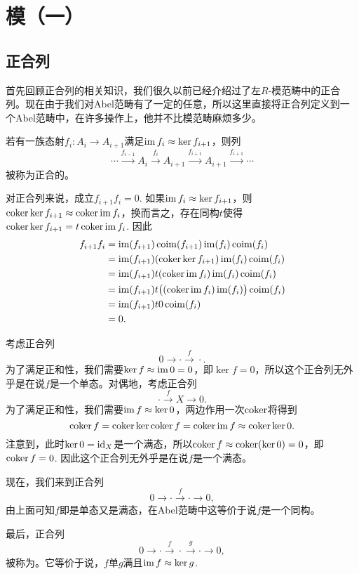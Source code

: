 
\chapter{模（一）}

\section{正合列}

首先回顾正合列的相关知识，我们很久以前已经介绍过了左$R$-模范畴中的正合列。现在由于我们对Abel范畴有了一定的任意，所以这里直接将正合列定义到一个Abel范畴中，在许多操作上，他并不比模范畴麻烦多少。

\begin{para}
若有一族态射$f_i:A_i\to A_{i+1}$满足$\operatorname{im} f_i\approx \ker f_{i+1}$，则列
\[
	\cdots \xrightarrow{f_{i-1}}A_i \xrightarrow{f_i} A_{i+1} \xrightarrow{f_{i+1}} A_{i+1}\xrightarrow{f_{i+1}}\cdots
\]
被称为正合的。
\end{para}

对正合列来说，成立$f_{i+1}f_i=0$. 如果$\operatorname{im} f_i\approx \ker f_{i+1}$，则$\operatorname{coker} \ker f_{i+1} \approx \operatorname{coker} \operatorname{im} f_i$，换而言之，存在同构$t$使得$\operatorname{coker} \ker f_{i+1}=t\operatorname{coker} \operatorname{im} f_i$. 因此
\begin{align*}
f_{i+1}f_i&=\operatorname{im}(f_{i+1})\operatorname{coim}(f_{i+1})\operatorname{im}(f_{i})\operatorname{coim}(f_{i})\\
	&=\operatorname{im}(f_{i+1})(\operatorname{coker} \ker f_{i+1}) \operatorname{im}(f_{i})\operatorname{coim}(f_{i})\\
	&=\operatorname{im}(f_{i+1})t(\operatorname{coker} \operatorname{im} f_i) \operatorname{im}(f_{i})\operatorname{coim}(f_{i})\\
	&=\operatorname{im}(f_{i+1})t\bigl((\operatorname{coker} \operatorname{im} f_i) \operatorname{im}(f_{i})\bigr)\operatorname{coim}(f_{i})\\
	&=\operatorname{im}(f_{i+1})t0\operatorname{coim}(f_{i})\\
	&=0.
\end{align*}

\begin{para}[短正合列]
考虑正合列
\[
	0\to \cdot \xrightarrow{f} \cdot.
\]
为了满足正和性，我们需要$\ker f \approx \operatorname{im} 0=0$，即$\ker f = 0$，所以这个正合列无外乎是在说$f$是一个单态。对偶地，考虑正合列
\[
	\cdot\xrightarrow{f} X \to  0.
\]
为了满足正和性，我们需要$\operatorname{im} f \approx \ker 0$，两边作用一次$\operatorname{coker}$将得到
\[
	\operatorname{coker} f=\operatorname{coker} \ker \operatorname{coker} f=\operatorname{coker} \operatorname{im} f \approx \operatorname{coker} \ker 0.
\]
注意到，此时$\ker 0=\operatorname{id}_X$是一个满态，所以$\operatorname{coker} f \approx \operatorname{coker}(\ker 0)=0$，即$\operatorname{coker} f = 0$. 因此这个正合列无外乎是在说$f$是一个满态。

现在，我们来到正合列
\[
	0\to \cdot \xrightarrow{f} \cdot \to 0,
\]
由上面可知$f$即是单态又是满态，在Abel范畴中这等价于说$f$是一个同构。

最后，正合列
\[
	0\to \cdot \xrightarrow{f} \cdot \xrightarrow{g}\cdot\to 0,
\]
被称为。它等价于说，$f$单$g$满且$\operatorname{im} f\approx \ker g$.
\end{para}

